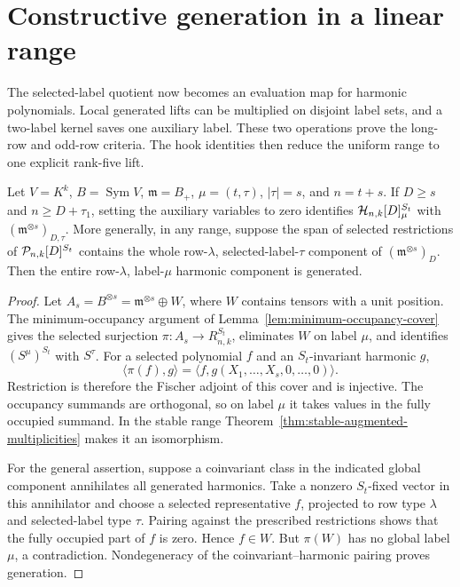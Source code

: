 \section{Constructive generation in a linear range}
\label{sec:linear-generation}

The selected-label quotient now becomes an evaluation map for harmonic
polynomials.  Local generated lifts can be multiplied on disjoint label
sets, and a two-label kernel saves one auxiliary label.  These two
operations prove the long-row and odd-row criteria.  The hook identities
then reduce the uniform range to one explicit rank-five lift.

\begin{lemma}\label{lem:selected-evaluation}
Let $V=K^k$, $B=\operatorname{Sym}V$, $\mathfrak m=B_+$, $\mu=(t,\tau)$,
$|\tau|=s$, and $n=t+s$.
If $D\ge s$ and $n\ge D+\tau_1$, setting the auxiliary variables to zero
identifies $\mathcal H_{n,k}[D]_\mu^{S_t}$ with
$(\mathfrak m^{\otimes s})_{D,\tau}$.
More generally, in any range, suppose the span of selected
restrictions of $\mathcal P_{n,k}[D]^{S_t}$ contains the whole
row-$\lambda$, selected-label-$\tau$ component of
$(\mathfrak m^{\otimes s})_D$.  Then the entire row-$\lambda$,
label-$\mu$ harmonic component is generated.
\end{lemma}
\begin{proof}
Let $A_s=B^{\otimes s}=\mathfrak m^{\otimes s}\oplus W$, where $W$
contains tensors with a unit position. The minimum-occupancy argument
of Lemma~\ref{lem:minimum-occupancy-cover} gives the selected surjection
$\pi:A_s\to R_{n,k}^{S_t}$, eliminates $W$ on label $\mu$, and
identifies $(S^\mu)^{S_t}$ with $S^\tau$.
For a selected polynomial $f$ and an $S_t$-invariant harmonic $g$,
\[
 \langle\pi(f),g\rangle
   =\langle f,g(X_1,\ldots,X_s,0,\ldots,0)\rangle.
\]
Restriction is therefore the Fischer adjoint of this cover and is
injective. The occupancy summands are orthogonal, so on label $\mu$
it takes values in the fully occupied summand. In the stable range
Theorem~\ref{thm:stable-augmented-multiplicities} makes it an isomorphism.

For the general assertion, suppose a coinvariant class in the
indicated global component annihilates all generated harmonics.
Take a nonzero $S_t$-fixed vector in this annihilator and choose
a selected representative $f$, projected to row type $\lambda$
and selected-label type $\tau$.  Pairing against the prescribed
restrictions shows that the fully occupied part of $f$ is zero.
Hence $f\in W$.  But $\pi(W)$ has no global label $\mu$, a
contradiction.  Nondegeneracy of the coinvariant--harmonic pairing
proves generation.
\end{proof}

